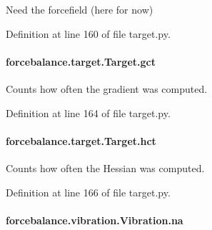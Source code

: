 Need the forcefield (here for now) 



Definition at line 160 of file target.\-py.

\hypertarget{classforcebalance_1_1target_1_1Target_aa625ac88c6744eb14ef281d9496d0dbb}{
\paragraph[{gct}]{\setlength{\rightskip}{0pt plus 5cm}forcebalance.\-target.\-Target.\-gct\hspace{0.3cm}{\ttfamily [inherited]}}}\label{classforcebalance_1_1target_1_1Target_aa625ac88c6744eb14ef281d9496d0dbb}


Counts how often the gradient was computed. 



Definition at line 164 of file target.\-py.

\hypertarget{classforcebalance_1_1target_1_1Target_a5b5a42f78052b47f29ed4b940c6111a1}{
\paragraph[{hct}]{\setlength{\rightskip}{0pt plus 5cm}forcebalance.\-target.\-Target.\-hct\hspace{0.3cm}{\ttfamily [inherited]}}}\label{classforcebalance_1_1target_1_1Target_a5b5a42f78052b47f29ed4b940c6111a1}


Counts how often the Hessian was computed. 



Definition at line 166 of file target.\-py.

\hypertarget{classforcebalance_1_1vibration_1_1Vibration_a31148c4d3157dddf2485c4e63496e120}{
\paragraph[{na}]{\setlength{\rightskip}{0pt plus 5cm}forcebalance.\-vibration.\-Vibration.\-na\hspace{0.3cm}{\ttfamily [inherited]}}}\label{classforcebalance_1_1vibration_1_1Vibration_a31148c4d3157dddf2485c4e63496e120}


